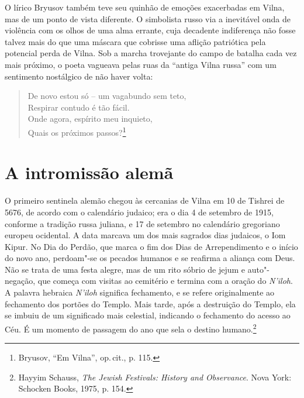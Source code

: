 O lírico Bryusov também teve seu quinhão de emoções exacerbadas em
Vilna, mas de um ponto de vista diferente. O simbolista russo via a
inevitável onda de violência com os olhos de uma alma errante, cuja
decadente indiferença não fosse talvez mais do que uma máscara que
cobrisse uma aflição patriótica pela potencial perda de Vilna. Sob a
marcha trovejante do campo de batalha cada vez mais próximo, o poeta
vagueava pelas ruas da ``antiga Vilna russa'' com um sentimento
nostálgico de não haver volta:

\begin{verse}
De novo estou só -- um vagabundo sem teto,\\
Respirar contudo é tão fácil.\\
Onde agora, espírito meu inquieto,\\
Quais os próximos passos?\footnote{Bryusov, ``Em Vilna'', op.\,cit., p. 115.}
\end{verse}

\chapter{A intromissão alemã}

\begin{epigraphs} 
\end{epigraphs}

O primeiro sentinela alemão chegou às cercanias de Vilna em 10 de Tishrei de
5676, de acordo com o calendário judaico; era o dia 4 de setembro de
1915, conforme a tradição russa juliana, e 17 de setembro no
calendário gregoriano europeu ocidental. A data marcava um dos mais
sagrados dias judaicos, o Iom Kipur. No Dia do Perdão, que marca o fim
dos Dias de Arrependimento e o início do novo ano, perdoam"-se os pecados
humanos e se reafirma a aliança com Deus. Não se trata de uma festa
alegre, mas de um rito sóbrio de jejum e auto"-negação, que começa com
visitas ao cemitério e termina com a oração do \textit{N'iloh}. A palavra
hebraica \textit{N'iloh} significa fechamento, e se refere originalmente
ao fechamento dos portões do Templo. Mais tarde, após a destruição do
Templo, ela se imbuiu de um significado mais celestial, indicando o
fechamento do acesso ao Céu. É um momento de passagem do ano que sela o
destino humano.\footnote{Hayyim Schauss, \textit{The Jewish Festivals: History and Observance}. Nova York: Schocken Books, 1975, p. 154.}

